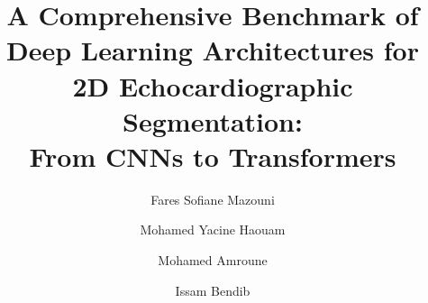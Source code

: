 \documentclass[review,1p,times]{elsarticle}
\begin{document}
\begin{frontmatter}

\title{A Comprehensive Benchmark of Deep Learning Architectures for
       2D Echocardiographic Segmentation:\\
       From CNNs to Transformers}

\author[a]{Fares Sofiane Mazouni}

\author[a]{Mohamed Yacine Haouam}

\author[a]{Mohamed Amroune}

\author[a]{Issam Bendib}


\address[a]{Laboratory of Mathematics, Informatics and Systems (LAMIS), Echahid Cheikh Larbi Tebessi University, Tebessa, 12002, Algeria}


\end{frontmatter}
\end{document}

